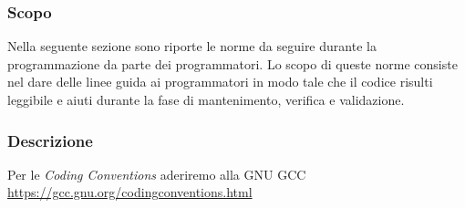 \documentclass[../NomeDocumento.tex]{subfiles}
\begin{document}
	\subsubsection{Scopo}
	
	Nella seguente sezione sono riporte le norme da seguire durante la programmazione da parte dei programmatori. Lo scopo di queste norme consiste nel dare delle linee guida ai programmatori in modo tale che il codice risulti leggibile e aiuti durante la fase di mantenimento, verifica e validazione.

	\subsubsection{Descrizione}
	
	Per le \emph{Coding Conventions} aderiremo alla GNU GCC \url{https://gcc.gnu.org/codingconventions.html}
\end{document}
